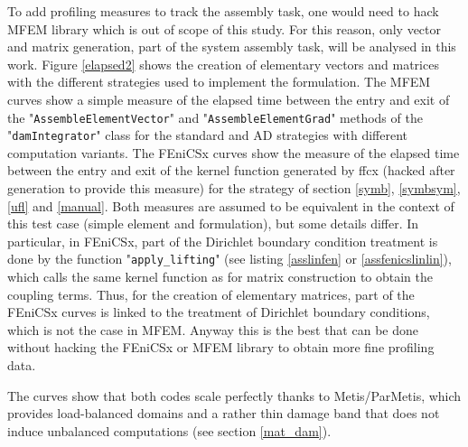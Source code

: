 \documentclass[12pt]{article}
\newcommand{\f}[1]{FEniCSx#1}
\newcommand{\mycode}[1]{\textsf{"}\lstinline`#1`\textsf{"}}
\begin{document}
To add profiling measures to track the assembly task, one would need to hack MFEM library which is out of scope of this study.
For this reason, only vector and matrix generation, part of the system assembly task, will be analysed in this work.
Figure \ref{elapsed2} shows the creation of elementary vectors and matrices with the different strategies used to implement the formulation.
The MFEM curves show a simple measure of the elapsed time between the entry and exit of the \mycode{AssembleElementVector} and \mycode{AssembleElementGrad} methods of the \mycode{damIntegrator} class for the standard and AD strategies with different computation variants. 
The \f{} curves show the measure of the elapsed time between the entry and exit of the kernel function generated by ffcx (hacked after generation to provide this measure) for the strategy of section \ref{symb}, \ref{symbsym}, \ref{ufl} and \ref{manual}.
Both measures are assumed to be equivalent in the context of this test case (simple element and formulation), but some details differ. In particular, in \f{}, part of the Dirichlet boundary condition treatment is done by the function \mycode{apply_lifting} (see listing \ref{asslinfen} or \ref{assfenicslinlin}), which calls the same kernel function as for matrix construction to obtain the coupling terms. Thus, for the creation of elementary matrices, part of the \f{} curves is linked to the treatment of Dirichlet boundary conditions, which is not the case in MFEM.
Anyway  this is the best that can be done without hacking the \f{} or MFEM library to obtain more fine profiling data. 

The curves show that both codes scale perfectly thanks to Metis/ParMetis, which provides load-balanced domains and a rather thin damage band that does not induce unbalanced computations (see section \ref{mat_dam}).
\end{document}

